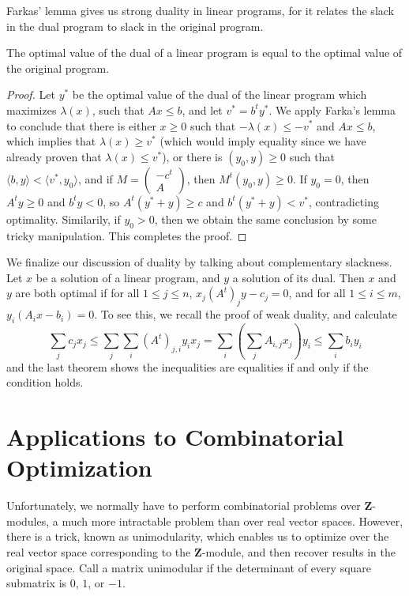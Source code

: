Farkas' lemma gives us strong duality in linear programs, for it relates the slack in the dual program to slack in the original program.

\begin{theorem}
    The optimal value of the dual of a linear program is equal to the optimal value of the original program.
\end{theorem}
\begin{proof}
    Let $y^*$ be the optimal value of the dual of the linear program which maximizes $\lambda(x)$, such that $Ax \leq b$, and let $v^* = b^t y^*$. We apply Farka's lemma to conclude that there is either $x \geq 0$ such that $- \lambda(x) \leq -v^*$ and $Ax \leq b$, which implies that $\lambda(x) \geq v^*$ (which would imply equality since we have already proven that $\lambda(x) \leq v^*$), or there is $(y_0, y) \geq 0$ such that $\langle b, y \rangle < \langle v^*, y_0 \rangle$, and if $M = \begin{pmatrix} -c^t \\ A \end{pmatrix}$, then $M^t (y_0, y) \geq 0$. If $y_0 = 0$, then $A^t y \geq 0$ and $b^t y < 0$, so $A^t(y^* + y) \geq c$ and $b^t(y^* + y) < v^*$, contradicting optimality. Similarily, if $y_0 > 0$, then we obtain the same conclusion by some tricky manipulation. This completes the proof.
\end{proof}

We finalize our discussion of duality by talking about complementary slackness. Let $x$ be a solution of a linear program, and $y$ a solution of its dual. Then $x$ and $y$ are both optimal if for all $1 \leq j \leq n$, $x_j (A^t)_j y - c_j = 0$, and for all $1 \leq i \leq m$, $y_i (A_i x - b_i) = 0$. To see this, we recall the proof of weak duality, and calculate
%
\[ \sum_j c_j x_j \leq \sum_j \sum_i (A^t)_{j,i} y_i x_j = \sum_i \left( \sum_j A_{i,j} x_j \right) y_i \leq \sum_i b_i y_i \]
%
and the last theorem shows the inequalities are equalities if and only if the condition holds.

\chapter{Applications to Combinatorial Optimization}

Unfortunately, we normally have to perform combinatorial problems over $\mathbf{Z}$-modules, a much more intractable problem than over real vector spaces. However, there is a trick, known as unimodularity, which enables us to optimize over the real vector space corresponding to the $\mathbf{Z}$-module, and then recover results in the original space. Call a matrix unimodular if the determinant of every square submatrix is $0$, $1$, or $-1$.

